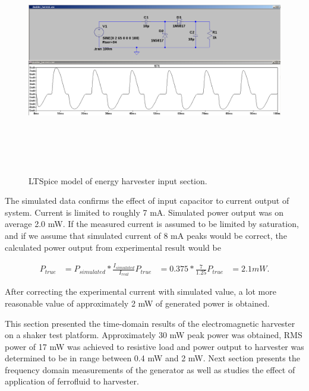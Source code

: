 \begin{figure}[htb]
\begin{center}
\includegraphics[height=10cm]{images/own_dwg/simulation/voltage_doubler.jpg}
\end{center}
\caption{\label{fig:simulated_doubler} LTSpice model of energy harvester input section.}
\end{figure}

The simulated data confirms the effect of input capacitor to current output of system. Current is limited to roughly 7 mA. Simulated power output was on average 2.0 mW. If the measured current is assumed to be limited by saturation, and if we assume that simulated current of 8 mA peaks would be correct, the calculated power output from experimental result would be 

\begin{align}
  P_{true}& = P_{simulated} * \frac{I_{simulated}}{I_{real}}
  P_{true}& = 0.375 * \frac{7}{1.25}
  P_{true}& = 2.1 mW.
\end{align}

After correcting the experimental current with simulated value, a lot more reasonable value of approximately 2 mW of generated power is obtained. 

This section presented the time-domain results of the electromagnetic harvester on a shaker test platform. Approximately 30 mW peak power was obtained, RMS power of 17 mW was achieved to resistive load and power output to harvester was determined to be in range between 0.4 mW and 2 mW. Next section presents the frequency domain measurements of the generator as well as studies the effect of application of ferrofluid to harvester.


